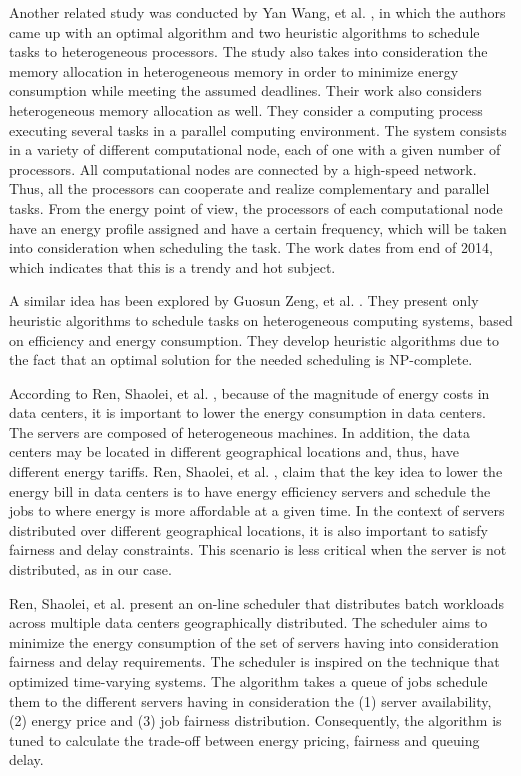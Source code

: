 Another related study was conducted by Yan Wang, et al. \cite{TASK_SCHED}, in which
the authors came up with an optimal algorithm and two heuristic algorithms to schedule tasks
to heterogeneous processors. The study also takes into consideration the 
memory allocation in heterogeneous memory in order
to minimize energy consumption while meeting the assumed deadlines. Their work also considers heterogeneous
memory allocation as well. They consider a
computing process executing several tasks in a parallel computing environment. The
system consists in a variety of different computational node, each of one with a
given number of processors. All computational nodes are connected by a
high-speed network. Thus, all  the processors can cooperate and realize complementary
and parallel tasks. From the energy point of view, the processors of each 
computational node have an energy profile assigned and have a certain frequency, 
which will be taken into consideration when scheduling the task. The work dates 
from end of 2014, which indicates that this is a trendy and hot subject. 

A similar idea has been explored by Guosun Zeng, et al. \cite{EXE_METHOD}. They present only
heuristic algorithms to schedule tasks on heterogeneous computing systems,
based on efficiency and energy consumption. They develop heuristic algorithms
due to the fact that an optimal solution for the needed scheduling is
NP-complete.  


According to Ren, Shaolei, et al. \cite{EFF_JOB_SCHEDULING}, because of the magnitude of energy costs in data centers, it is important to
lower the energy consumption in data centers. The servers are composed of
heterogeneous machines. In addition,
the data centers may be located in different geographical locations and, thus,
have different energy tariffs. Ren, Shaolei, et al. \cite{EFF_JOB_SCHEDULING}, claim that
the key idea to lower the energy bill in data centers is to have energy
efficiency servers and schedule the jobs to where energy is more affordable at a
given time. In the context of servers distributed over different geographical locations, it
is also important to satisfy fairness and delay constraints. This scenario is
less critical when the server is not distributed, as in our case.

Ren, Shaolei, et al. \cite{EFF_JOB_SCHEDULING} present an on-line scheduler that
distributes batch workloads across multiple data centers geographically
distributed. The scheduler aims to minimize the energy consumption of the set of
servers having into consideration fairness and delay requirements.  The scheduler is inspired on the technique that
optimized time-varying systems. The algorithm takes a queue of jobs schedule them to the different servers
having in consideration the (1) server availability, (2) energy price and (3)
job fairness distribution. Consequently, the algorithm is tuned to calculate the
trade-off between energy pricing, fairness and queuing delay.

